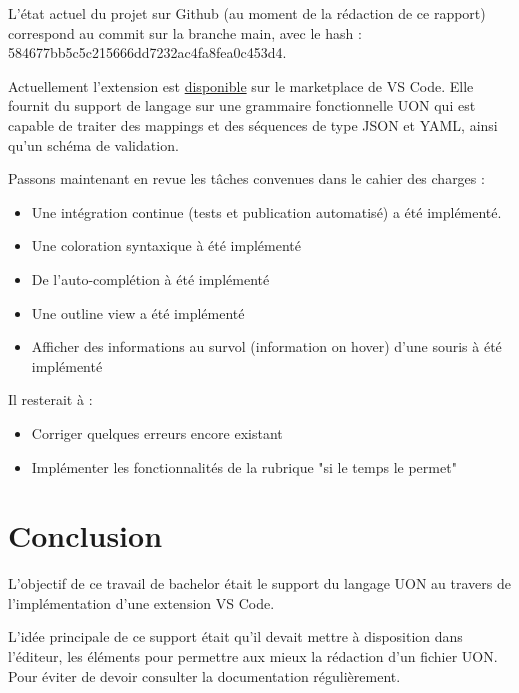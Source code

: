 \documentclass[
    iict, %
    il, %
]{heig-tb}
\begin{document}
L'état actuel du projet sur Github (au moment de la rédaction de ce rapport) correspond au commit sur la branche main, avec le hash : 584677bb5c5c215666dd7232ac4fa8fea0c453d4.

Actuellement l'extension est \href{https://marketplace.visualstudio.com/items?itemName=vitorva.vscode-uon}{disponible} sur le marketplace de VS Code.
Elle fournit du support de langage sur une grammaire fonctionnelle UON qui est capable de traiter des mappings et des séquences de type JSON et YAML, ainsi qu'un schéma de validation.

Passons maintenant en revue les tâches convenues dans le cahier des charges :

\begin{itemize}
    \item Une intégration continue (tests et publication automatisé) a été implémenté.
    \item Une coloration syntaxique à été implémenté
    \item De l'auto-complétion à été implémenté
    \item Une outline view a été implémenté
    \item Afficher des informations au survol (information on hover) d'une souris à été implémenté
\end{itemize}

Il resterait à :

\begin{itemize}
    \item Corriger quelques erreurs encore existant
    \item Implémenter les fonctionnalités de la rubrique "si le temps le permet"
\end{itemize}

\chapter{Conclusion}



L'objectif de ce travail de bachelor était le support du langage UON au travers de l'implémentation d'une extension VS Code.

L'idée principale de ce support était qu'il devait mettre à disposition dans l'éditeur, les éléments pour permettre aux mieux la rédaction d'un fichier UON.
Pour éviter de devoir consulter la documentation régulièrement.
\end{document}
